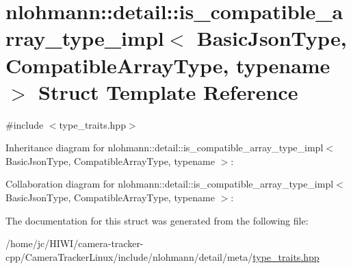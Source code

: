 \hypertarget{structnlohmann_1_1detail_1_1is__compatible__array__type__impl}{}\section{nlohmann\+:\+:detail\+:\+:is\+\_\+compatible\+\_\+array\+\_\+type\+\_\+impl$<$ Basic\+Json\+Type, Compatible\+Array\+Type, typename $>$ Struct Template Reference}
\label{structnlohmann_1_1detail_1_1is__compatible__array__type__impl}


{\ttfamily \#include $<$type\+\_\+traits.\+hpp$>$}



Inheritance diagram for nlohmann\+:\+:detail\+:\+:is\+\_\+compatible\+\_\+array\+\_\+type\+\_\+impl$<$ Basic\+Json\+Type, Compatible\+Array\+Type, typename $>$\+:


Collaboration diagram for nlohmann\+:\+:detail\+:\+:is\+\_\+compatible\+\_\+array\+\_\+type\+\_\+impl$<$ Basic\+Json\+Type, Compatible\+Array\+Type, typename $>$\+:


The documentation for this struct was generated from the following file\+:\begin{DoxyCompactItemize}
\item 
/home/jc/\+H\+I\+W\+I/camera-\/tracker-\/cpp/\+Camera\+Tracker\+Linux/include/nlohmann/detail/meta/\hyperlink{type__traits_8hpp}{type\+\_\+traits.\+hpp}\end{DoxyCompactItemize}
